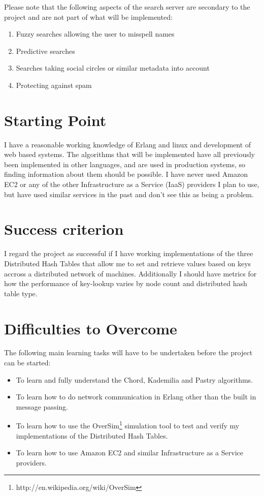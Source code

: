 Please note that the following aspects of the search server are secondary to the project and are not part of what will be implemented:

\begin{enumerate}
  \item Fuzzy searches allowing the user to misspell names
  \item Predictive searches
  \item Searches taking social circles or similar metadata into account
  \item Protecting against spam
\end{enumerate}


\section*{Starting Point}

I have a reasonable working knowledge of Erlang and linux and development of web based systems. The algorithms that will be implemented have all previously been implemented in other languages, and are used in production systems, so finding information about them should be possible. I have never used Amazon EC2 or any of the other Infrastructure as a Service (IaaS) providers I plan to use, but have used similar services in the past and don't see this as being a problem.


\section*{Success criterion}

I regard the project as successful if I have working implementations of the three Distributed Hash Tables that allow me to set and retrieve values based on keys accross a distributed network of machines. Additionally I should have metrics for how the performance of key-lookup varies by node count and distributed hash table type.

\section*{Difficulties to Overcome}

The following main learning tasks will have to be undertaken before 
the project can be started:

\begin{itemize}

\item To learn and fully understand the Chord, Kademilia and Pastry algorithms.

\item To learn how to do network communication in Erlang other than the built in message passing.

\item To learn how to use the OverSim\footnote{http://en.wikipedia.org/wiki/OverSim} simulation tool to test and verify my implementations of the Distributed Hash Tables.

\item To learn how to use Amazon EC2 and similar Infrastructure as a Service providers.

\end{itemize}


